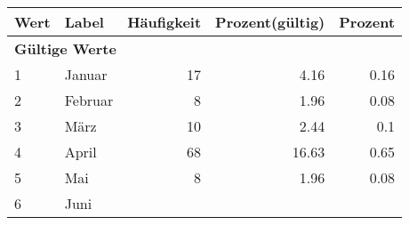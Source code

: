      \begin{longtable}{lXrrr}
     \toprule
     \textbf{Wert} & \textbf{Label} & \textbf{Häufigkeit} & \textbf{Prozent(gültig)} & \textbf{Prozent} \\
     \endhead
     \midrule
     \multicolumn{5}{l}{\textbf{Gültige Werte}}\\

     1 &
     \multicolumn{1}{X}{ Januar   } &


       \num{17} &
       \num[round-mode=places,round-precision=2]{4,16} &
         \num[round-mode=places,round-precision=2]{0,16} \\

     2 &
     \multicolumn{1}{X}{ Februar   } &


       \num{8} &
       \num[round-mode=places,round-precision=2]{1,96} &
         \num[round-mode=places,round-precision=2]{0,08} \\

     3 &
     \multicolumn{1}{X}{ März   } &


       \num{10} &
       \num[round-mode=places,round-precision=2]{2,44} &
         \num[round-mode=places,round-precision=2]{0,1} \\

     4 &
     \multicolumn{1}{X}{ April   } &


       \num{68} &
       \num[round-mode=places,round-precision=2]{16,63} &
         \num[round-mode=places,round-precision=2]{0,65} \\

     5 &
     \multicolumn{1}{X}{ Mai   } &


       \num{8} &
       \num[round-mode=places,round-precision=2]{1,96} &
         \num[round-mode=places,round-precision=2]{0,08} \\

     6 &
     \multicolumn{1}{X}{ Juni   } &



\end{longtable}

